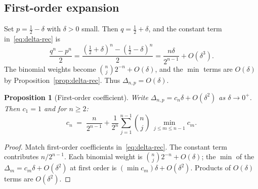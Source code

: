 \documentclass[reqno,final,11pt]{amsart}
\theoremstyle{plain}
\newtheorem{proposition}[theorem]{Proposition}
\theoremstyle{definition}
\theoremstyle{remark}
\begin{document}
\subsection{First-order expansion}

Set $p=\tfrac12-\delta$ with $\delta>0$ small.  Then
$q=\tfrac12+\delta$, and the constant term in~\eqref{eq:delta-rec} is
\[
  \frac{q^n-p^n}{2}
  = \frac{(\tfrac12+\delta)^n-(\tfrac12-\delta)^n}{2}
  = \frac{n\delta}{2^{n-1}} + O(\delta^3).
\]
The binomial weights become $\binom{n}{j}2^{-n}+O(\delta)$, and the
$\min$ terms are $O(\delta)$ by Proposition~\ref{prop:delta-rec}.
Thus $\Delta_{n,p}=O(\delta)$.

\begin{proposition}[First-order coefficient]\label{prop:cn}
  Write $\Delta_{n,p}=c_n\delta+O(\delta^2)$ as $\delta\to 0^+$.
  Then $c_1=1$ and for $n\ge 2$:
  \begin{equation}\label{eq:cn-rec}
    c_n \;=\; \frac{n}{2^{n-1}}
    + \frac{1}{2^n}\sum_{j=1}^{n-1}\binom{n}{j}\,
    \min_{j\le m\le n-1}c_m.
  \end{equation}
\end{proposition}

\begin{proof}
  Match first-order coefficients in~\eqref{eq:delta-rec}.  The
  constant term contributes $n/2^{n-1}$.  Each binomial weight is
  $\binom{n}{j}2^{-n}+O(\delta)$; the $\min$ of the
  $\Delta_m=c_m\delta+O(\delta^2)$ at first order is
  $(\min c_m)\delta+O(\delta^2)$.  Products of $O(\delta)$ terms are
  $O(\delta^2)$.
\end{proof}
\end{document}
